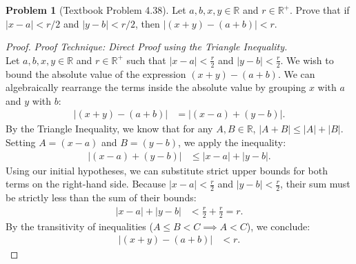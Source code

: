 \documentclass[11pt]{article}
\theoremstyle{definition}
\newtheorem{problem}{Problem}
\theoremstyle{remark}
\begin{document}
\begin{itemize}
\begin{problem}[Textbook Problem 4.38]
Let $a, b, x, y \in \mathbb{R}$ and $r \in \mathbb{R}^{+}$. Prove that if $|x - a| < r/2$ and $|y - b| < r/2$, then $|(x + y) - (a + b)| < r$.
\end{problem}
\begin{proof}
\textit{Proof Technique: Direct Proof using the Triangle Inequality.} \\
Let $a, b, x, y \in \mathbb{R}$ and $r \in \mathbb{R}^{+}$ such that $|x - a| < \frac{r}{2}$ and $|y - b| < \frac{r}{2}$. 
We wish to bound the absolute value of the expression $(x + y) - (a + b)$. We can algebraically rearrange the terms inside the absolute value by grouping $x$ with $a$ and $y$ with $b$:
\begin{align*}
    |(x + y) - (a + b)| &= |(x - a) + (y - b)|.
\end{align*}
By the Triangle Inequality, we know that for any $A, B \in \mathbb{R}$, $|A + B| \le |A| + |B|$. Setting $A = (x - a)$ and $B = (y - b)$, we apply the inequality:
\begin{align*}
    |(x - a) + (y - b)| &\le |x - a| + |y - b|.
\end{align*}
Using our initial hypotheses, we can substitute strict upper bounds for both terms on the right-hand side. Because $|x - a| < \frac{r}{2}$ and $|y - b| < \frac{r}{2}$, their sum must be strictly less than the sum of their bounds:
\begin{align*}
    |x - a| + |y - b| &< \frac{r}{2} + \frac{r}{2} = r.
\end{align*}
By the transitivity of inequalities ($A \le B < C \implies A < C$), we conclude:
\begin{align*}
    |(x + y) - (a + b)| &< r.
\end{align*}
\end{proof}


\end{itemize}
\end{document}
